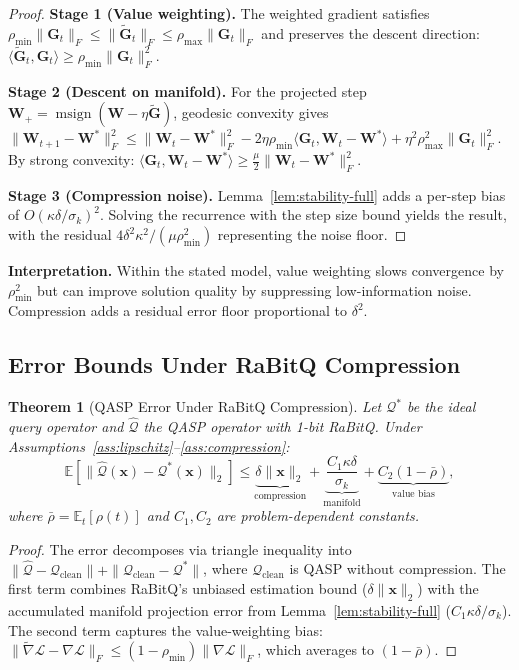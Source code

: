 \documentclass[twocolumn]{article}
\newtheorem{theorem}{Theorem}
\DeclareMathOperator{\msign}{msign}
\begin{document}
\begin{proof}
\textbf{Stage 1 (Value weighting).} The weighted gradient satisfies $\rho_{\min} \|\mathbf{G}_t\|_F \leq \|\widetilde{\mathbf{G}}_t\|_F \leq \rho_{\max} \|\mathbf{G}_t\|_F$ and preserves the descent direction: $\langle \widetilde{\mathbf{G}}_t, \mathbf{G}_t \rangle \geq \rho_{\min} \|\mathbf{G}_t\|_F^2$.

\textbf{Stage 2 (Descent on manifold).} For the projected step $\mathbf{W}_{+} = \msign(\mathbf{W} - \eta \widetilde{\mathbf{G}})$, geodesic convexity gives $\|\mathbf{W}_{t+1} - \mathbf{W}^*\|_F^2 \leq \|\mathbf{W}_t - \mathbf{W}^*\|_F^2 - 2\eta \rho_{\min} \langle \mathbf{G}_t, \mathbf{W}_t - \mathbf{W}^* \rangle + \eta^2 \rho_{\max}^2 \|\mathbf{G}_t\|_F^2$.
By strong convexity: $\langle \mathbf{G}_t, \mathbf{W}_t - \mathbf{W}^* \rangle \geq \frac{\mu}{2}\|\mathbf{W}_t - \mathbf{W}^*\|_F^2$.

\textbf{Stage 3 (Compression noise).} Lemma~\ref{lem:stability-full} adds a per-step bias of $O(\kappa \delta / \sigma_k)^2$. Solving the recurrence with the step size bound yields the result, with the residual $4\delta^2 \kappa^2 / (\mu \rho_{\min}^2)$ representing the noise floor.
\end{proof}

\textbf{Interpretation.} Within the stated model, value weighting slows convergence by $\rho_{\min}^2$ but can improve solution quality by suppressing low-information noise. Compression adds a residual error floor proportional to $\delta^2$.

\subsection{Error Bounds Under RaBitQ Compression}

\begin{theorem}[QASP Error Under RaBitQ Compression]\label{thm:rabitq_error}
Let $\mathcal{Q}^*$ be the ideal query operator and $\hat{\mathcal{Q}}$ the QASP operator with 1-bit RaBitQ. Under Assumptions~\ref{ass:lipschitz}--\ref{ass:compression}:
\[
\mathbb{E}[\|\hat{\mathcal{Q}}(\mathbf{x}) - \mathcal{Q}^*(\mathbf{x})\|_2] \leq \underbrace{\delta \|\mathbf{x}\|_2}_{\text{compression}} + \underbrace{\frac{C_1 \kappa \delta}{\sigma_k}}_{\text{manifold}} + \underbrace{C_2 (1 - \bar{\rho})}_{\text{value bias}},
\]
where $\bar{\rho} = \mathbb{E}_t[\rho(t)]$ and $C_1, C_2$ are problem-dependent constants.
\end{theorem}

\begin{proof}
The error decomposes via triangle inequality into $\|\hat{\mathcal{Q}} - \mathcal{Q}_{\text{clean}}\| + \|\mathcal{Q}_{\text{clean}} - \mathcal{Q}^*\|$, where $\mathcal{Q}_{\text{clean}}$ is QASP without compression. The first term combines RaBitQ's unbiased estimation bound ($\delta \|\mathbf{x}\|_2$) with the accumulated manifold projection error from Lemma~\ref{lem:stability-full} ($C_1 \kappa \delta / \sigma_k$). The second term captures the value-weighting bias: $\|\widetilde{\nabla} \mathcal{L} - \nabla \mathcal{L}\|_F \leq (1 - \rho_{\min}) \|\nabla \mathcal{L}\|_F$, which averages to $(1 - \bar{\rho})$.
\end{proof}
\end{document}
